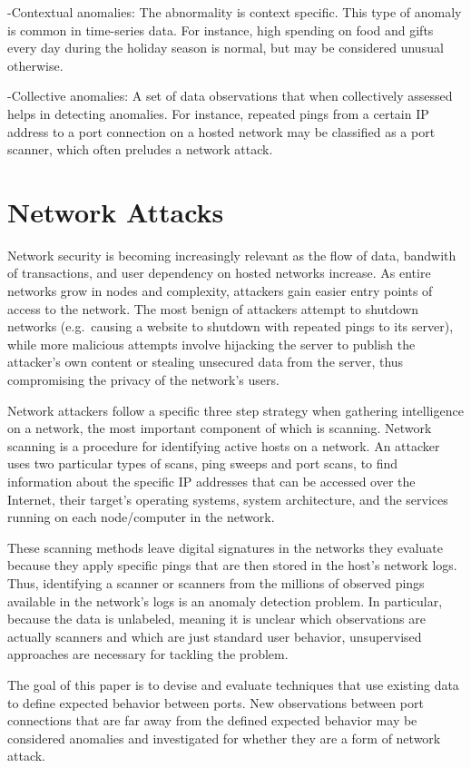 \documentclass[12pt,twoside]{dukestatscithesis}
\theoremstyle{definition}
\theoremstyle{definition}
\theoremstyle{definition}
\theoremstyle{remark}
\begin{document}
-Contextual anomalies: The abnormality is context specific. This type of
anomaly is common in time-series data. For instance, high spending on
food and gifts every day during the holiday season is normal, but may be
considered unusual otherwise.

-Collective anomalies: A set of data observations that when collectively
assessed helps in detecting anomalies. For instance, repeated pings from
a certain IP address to a port connection on a hosted network may be
classified as a port scanner, which often preludes a network attack.

\section{Network Attacks}\label{network-attacks}

Network security is becoming increasingly relevant as the flow of data,
bandwith of transactions, and user dependency on hosted networks
increase. As entire networks grow in nodes and complexity, attackers
gain easier entry points of access to the network. The most benign of
attackers attempt to shutdown networks (e.g.~causing a website to
shutdown with repeated pings to its server), while more malicious
attempts involve hijacking the server to publish the attacker's own
content or stealing unsecured data from the server, thus compromising
the privacy of the network's users.

Network attackers follow a specific three step strategy when gathering
intelligence on a network, the most important component of which is
scanning. Network scanning is a procedure for identifying active hosts
on a network. An attacker uses two particular types of scans, ping
sweeps and port scans, to find information about the specific IP
addresses that can be accessed over the Internet, their target's
operating systems, system architecture, and the services running on each
node/computer in the network.

These scanning methods leave digital signatures in the networks they
evaluate because they apply specific pings that are then stored in the
host's network logs. Thus, identifying a scanner or scanners from the
millions of observed pings available in the network's logs is an anomaly
detection problem. In particular, because the data is unlabeled, meaning
it is unclear which observations are actually scanners and which are
just standard user behavior, unsupervised approaches are necessary for
tackling the problem.

The goal of this paper is to devise and evaluate techniques that use
existing data to define expected behavior between ports. New
observations between port connections that are far away from the defined
expected behavior may be considered anomalies and investigated for
whether they are a form of network attack.
\end{document}

